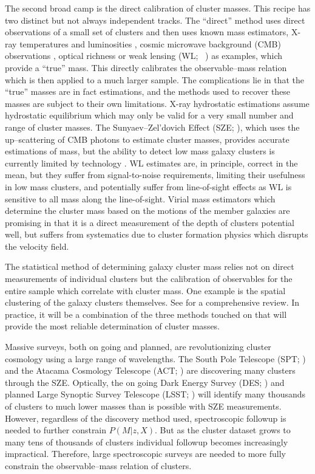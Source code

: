 \documentclass[fleqn,usenatbib]{mnras}
\begin{document}
The second broad camp is the direct calibration of cluster masses. This recipe has two distinct but not always independent tracks. The ``direct'' method uses direct observations of a small set of clusters and then uses known mass estimators, X-ray temperatures and luminosities , cosmic microwave background (CMB) observations , optical richness  or weak lensing (WL; \eg\ \citealt{Rozo2010}) as examples, which provide a ``true'' mass. This directly calibrates the observable--mass relation which is then applied to a much larger sample. The complications lie in that the ``true'' masses are in fact estimations, and the methods used to recover these masses are subject to their own limitations. X-ray hydrostatic estimations assume hydrostatic equilibrium  which may only be valid for a very small number and range of cluster masses. The Sunyaev--Zel'dovich Effect (SZE; \citealt{Sunyaev1972}), which uses the up--scattering of CMB photons to estimate cluster masses, provides accurate estimations of mass, but the ability to detect low mass galaxy clusters is currently limited by technology . WL estimates are, in principle, correct in the mean, but they suffer from signal-to-noise requirements, limiting their usefulness in low mass clusters, and potentially suffer from line-of-sight effects as WL is sensitive to all mass along the line-of-sight. Virial mass estimators which determine the cluster mass based on the motions of the member galaxies  are promising in that it is a direct measurement of the depth of clusters potential well, but suffers from systematics due to cluster formation physics which disrupts the velocity field.
 
The statistical method of determining galaxy cluster mass relies not on direct measurements of individual clusters but the calibration of observables for the entire sample which correlate with cluster mass. One example is the spatial clustering of the galaxy clusters themselves. See \cite{Weinberg2013} for a comprehensive review. In practice, it will be a combination of the three methods touched on that will provide the most reliable determination of cluster masses.

Massive surveys, both on going and planned, are revolutionizing cluster cosmology using a large range of wavelengths. The South Pole Telescope (SPT; \citealt{Carlstrom2011}) and the Atacama Cosmology Telescope (ACT; \citealt{Swetz2011}) are discovering many clusters through the SZE. Optically, the on going Dark Energy Survey (DES; \citealt{DES2005}) and planned Large Synoptic Survey Telescope (LSST; \citealt{LSST2012}) will identify many thousands of clusters to much lower masses than is possible with SZE measurements. However, regardless of the discovery method used, spectroscopic followup is needed to further constrain $P(M|z,X)$. But as the cluster dataset grows to many tens of thousands of clusters individual followup becomes increasingly impractical. Therefore, large spectroscopic surveys are needed to more fully constrain the observable--mass relation of clusters.
\end{document}
